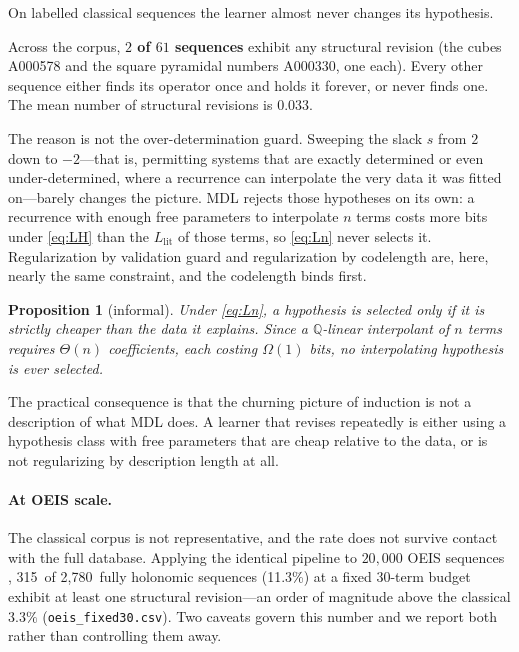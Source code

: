 \documentclass[10pt]{article}
\theoremstyle{definition}
\theoremstyle{plain}
\newtheorem{proposition}{Proposition}
\newcommand{\Llit}{L_{\mathrm{lit}}}
\newcommand{\oeisHol}{2{,}780}          %
\newcommand{\oeisRev}{315}              %
\newcommand{\oeisRevPct}{11.3\%}        %
\begin{document}
On labelled classical sequences the learner almost never changes its
hypothesis.

Across the corpus, \textbf{$2$ of $61$ sequences} exhibit any structural
revision (the cubes A000578 and the square pyramidal numbers A000330, one
each). Every other sequence either finds its operator once and holds it
forever, or never finds one. The mean number of structural revisions is
$0.033$.

The reason is not the over-determination guard. Sweeping the slack $s$ from
$2$ down to $-2$---that is, permitting systems that are exactly determined or
even under-determined, where a recurrence can interpolate the very data it was
fitted on---barely changes the picture. MDL rejects those hypotheses on its
own: a recurrence with enough free parameters to interpolate $n$ terms costs
more bits under \eqref{eq:LH} than the $\Llit$ of those terms, so
\eqref{eq:Ln} never selects it. Regularization by validation guard and
regularization by codelength are, here, nearly the same constraint, and the
codelength binds first.

\begin{proposition}[informal]
Under \eqref{eq:Ln}, a hypothesis is selected only if it is strictly cheaper
than the data it explains. Since a $\mathbb{Q}$-linear interpolant of $n$ terms
requires $\Theta(n)$ coefficients, each costing $\Omega(1)$ bits, no
interpolating hypothesis is ever selected.
\end{proposition}

The practical consequence is that the churning picture of induction is not a
description of what MDL does. A learner that revises repeatedly is either using
a hypothesis class with free parameters that are cheap relative to the data, or
is not regularizing by description length at all.

\paragraph{At OEIS scale.} The classical corpus is not representative, and the
rate does not survive contact with the full database. Applying the identical
pipeline to $20{,}000$ OEIS sequences \citep{oeis}, \oeisRev\ of \oeisHol\
fully holonomic sequences (\oeisRevPct) at a fixed $30$-term budget
exhibit at least one structural revision---an order of magnitude above the
classical $3.3\%$ (\texttt{oeis\_fixed30.csv}). Two caveats govern this
number and we report both rather than controlling them away.
\end{document}
